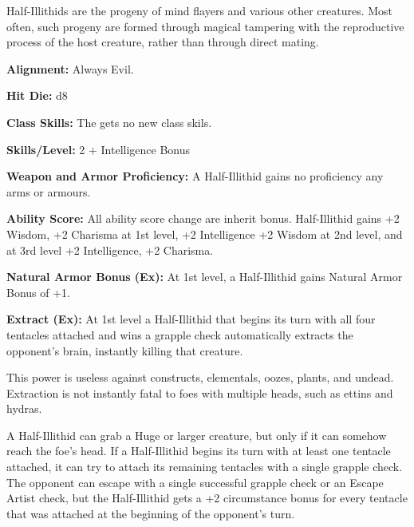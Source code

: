 
Half-Illithids are the progeny of mind flayers and various other creatures. Most often, such progeny are formed through magical tampering with the reproductive process of the host creature, rather than through direct mating.

\textbf{Alignment:} Always Evil.

\textbf{Hit Die:} d8

\textbf{Class Skills:} The \currentclassname{} gets no new class skils.

\textbf{Skills/Level:} 2 + Intelligence Bonus

\modebab{}
\poorfor{}
\poorref{}
\goodwil{}

\begin{classtable}
\end{classtable}

\classfeatures

\textbf{Weapon and Armor Proficiency:} A Half-Illithid gains no proficiency any arms or armours.

\textbf{Ability Score:} All ability score change are inherit bonus. Half-Illithid gains +2 Wisdom, +2 Charisma at 1st level, +2 Intelligence +2 Wisdom at 2nd level, and at 3rd level +2 Intelligence, +2 Charisma.
 
\textbf{Natural Armor Bonus (Ex):} At 1st level, a Half-Illithid gains Natural Armor Bonus of +1.
 
 \textbf{Extract (Ex):} At 1st level a Half-Illithid that begins its turn with all four tentacles attached and wins a grapple check automatically extracts the opponent’s brain, instantly killing that creature.
 
This power is useless against constructs, elementals, oozes, plants, and undead. Extraction is not instantly fatal to foes with multiple heads, such as ettins and hydras.

A Half-Illithid can grab a Huge or larger creature, but only if it can somehow reach the foe’s head. If a Half-Illithid begins its turn with at least one tentacle attached, it can try to attach its remaining tentacles with a single grapple check. The opponent can escape with a single successful grapple check or an Escape Artist check, but the Half-Illithid gets a +2 circumstance bonus for every tentacle that was attached at the beginning of the opponent’s turn.

